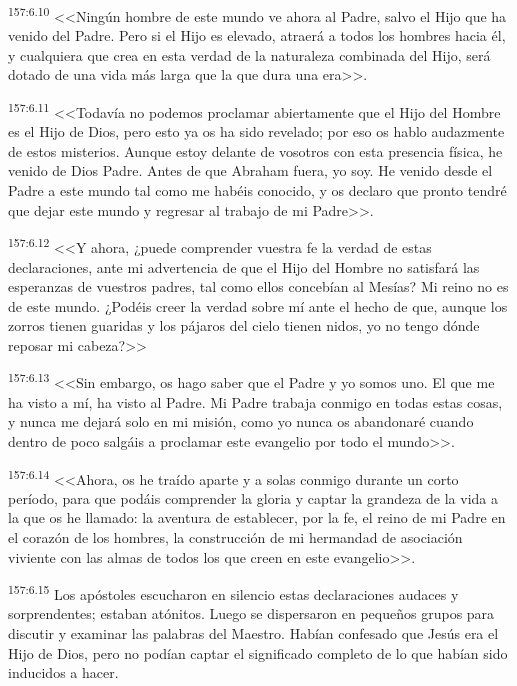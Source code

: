 \par 
\textsuperscript{157:6.10} <<Ningún hombre de este mundo ve ahora al Padre, salvo el Hijo que ha venido del Padre. Pero si el Hijo es elevado, atraerá a todos los hombres hacia él, y cualquiera que crea en esta verdad de la naturaleza combinada del Hijo, será dotado de una vida más larga que la que dura una era>>.

\par 
\textsuperscript{157:6.11} <<Todavía no podemos proclamar abiertamente que el Hijo del Hombre es el Hijo de Dios, pero esto ya os ha sido revelado; por eso os hablo audazmente de estos misterios. Aunque estoy delante de vosotros con esta presencia física, he venido de Dios Padre. Antes de que Abraham fuera, yo soy. He venido desde el Padre a este mundo tal como me habéis conocido, y os declaro que pronto tendré que dejar este mundo y regresar al trabajo de mi Padre>>.

\par 
\textsuperscript{157:6.12} <<Y ahora, ¿puede comprender vuestra fe la verdad de estas declaraciones, ante mi advertencia de que el Hijo del Hombre no satisfará las esperanzas de vuestros padres, tal como ellos concebían al Mesías? Mi reino no es de este mundo. ¿Podéis creer la verdad sobre mí ante el hecho de que, aunque los zorros tienen guaridas y los pájaros del cielo tienen nidos, yo no tengo dónde reposar mi cabeza?>>

\par 
\textsuperscript{157:6.13} <<Sin embargo, os hago saber que el Padre y yo somos uno. El que me ha visto a mí, ha visto al Padre. Mi Padre trabaja conmigo en todas estas cosas, y nunca me dejará solo en mi misión, como yo nunca os abandonaré cuando dentro de poco salgáis a proclamar este evangelio por todo el mundo>>.

\par 
\textsuperscript{157:6.14} <<Ahora, os he traído aparte y a solas conmigo durante un corto período, para que podáis comprender la gloria y captar la grandeza de la vida a la que os he llamado: la aventura de establecer, por la fe, el reino de mi Padre en el corazón de los hombres, la construcción de mi hermandad de asociación viviente con las almas de todos los que creen en este evangelio>>.

\par 
\textsuperscript{157:6.15} Los apóstoles escucharon en silencio estas declaraciones audaces y sorprendentes; estaban atónitos. Luego se dispersaron en pequeños grupos para discutir y examinar las palabras del Maestro. Habían confesado que Jesús era el Hijo de Dios, pero no podían captar el significado completo de lo que habían sido inducidos a hacer.

